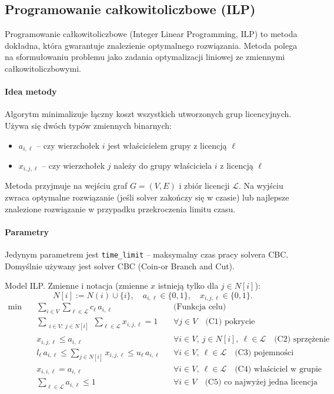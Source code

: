 \subsection{Programowanie całkowitoliczbowe (ILP)}\label{subsec:ilp}

Programowanie całkowitoliczbowe (Integer Linear Programming, ILP) to metoda dokładna, która gwarantuje znalezienie optymalnego rozwiązania. Metoda polega na sformułowaniu problemu jako zadania optymalizacji liniowej ze zmiennymi całkowitoliczbowymi.

\paragraph{Idea metody}
Algorytm minimalizuje łączny koszt wszystkich utworzonych grup licencyjnych. Używa się dwóch typów zmiennych binarnych:
\begin{itemize}
  \item $a_{i,\ell}$ -- czy wierzchołek $i$ jest właścicielem grupy z licencją $\ell$
  \item $x_{i,j,\ell}$ -- czy wierzchołek $j$ należy do grupy właściciela $i$ z licencją $\ell$
\end{itemize}

Metoda przyjmuje na wejściu graf $G=(V,E)$ i zbiór licencji $\mathcal{L}$. Na wyjściu zwraca optymalne rozwiązanie (jeśli solver zakończy się w czasie) lub najlepsze znalezione rozwiązanie w przypadku przekroczenia limitu czasu.

\paragraph{Parametry}
Jedynym parametrem jest \texttt{time\_limit} -- maksymalny czas pracy solvera CBC. Domyślnie używany jest solver CBC (Coin-or Branch and Cut).

Model ILP. Zmienne i notacja (zmienne $x$ istnieją tylko dla $j\in N[i]$):
\[
N[i] := N(i)\cup\{i\},\quad a_{i,\ell}\in\{0,1\},\quad x_{i,j,\ell}\in\{0,1\}.
\]
\begin{align}
\min\quad & \sum_{i\in V}\sum_{\ell\in\mathcal{L}} c_\ell\, a_{i,\ell} && \text{(Funkcja celu)}\\[4pt]
& \sum_{\substack{i\in V:\ j\in N[i]}}\sum_{\ell\in\mathcal{L}} x_{i,j,\ell} = 1 && \forall j\in V \quad \text{(C1) pokrycie} \label{C1}\\[2pt]
& x_{i,j,\ell} \le a_{i,\ell} && \forall i\in V,\ j\in N[i],\ \ell\in\mathcal{L} \quad \text{(C2) sprzężenie} \label{C2}\\[2pt]
& l_\ell\, a_{i,\ell} \le \sum_{j\in N[i]} x_{i,j,\ell} \le u_\ell\, a_{i,\ell} && \forall i\in V,\ \ell\in\mathcal{L} \quad \text{(C3) pojemności} \label{C3}\\[2pt]
& x_{i,i,\ell} = a_{i,\ell} && \forall i\in V,\ \ell\in\mathcal{L} \quad \text{(C4) właściciel w grupie} \label{C4}\\[2pt]
& \sum_{\ell\in\mathcal{L}} a_{i,\ell} \le 1 && \forall i\in V \quad \text{(C5) co najwyżej jedna licencja} \label{C5}
\end{align}

